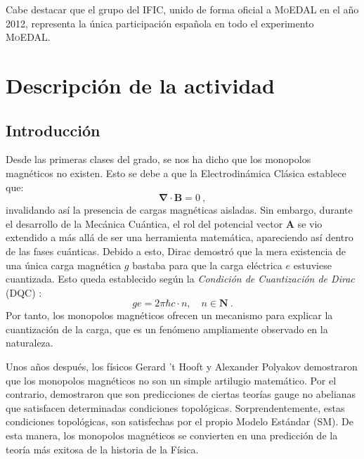 \documentclass[12pt, a4paper]{article}
\begin{document}
Cabe destacar que el grupo del IFIC, unido de forma oficial a \textsc{MoEDAL} en el año 2012, representa la única participación española en todo el experimento \textsc{MoEDAL}.
\section{Descripción de la actividad}
\subsection{Introducción}

Desde las primeras clases del grado, se nos ha dicho que los monopolos magnéticos no existen. Esto se debe a que la Electrodinámica Clásica establece que:
\begin{equation}
    \boldsymbol{\nabla}\cdot \boldsymbol{B}=0\ ,
\end{equation}
invalidando así la presencia de cargas magnéticas aisladas. Sin embargo, durante el desarrollo de la Mecánica Cuántica, el rol del potencial vector $\boldsymbol{A}$ se vio extendido a más allá de ser una herramienta matemática, apareciendo así dentro de las fases cuánticas. Debido a esto, Dirac demostró que la mera existencia de una única carga magnética $g$ bastaba para que la carga eléctrica $e$ estuviese cuantizada. Esto queda establecido según la \textit{Condición de Cuantización de Dirac} (DQC) \cite{Dirac1931}:
\begin{equation}
    ge=2\pi\hbar c\cdot n, \quad n\in \mathbf{N}\ .
\end{equation}
Por tanto, los monopolos magnéticos ofrecen un mecanismo para explicar la cuantización de la carga, que es un fenómeno ampliamente observado en la naturaleza.

Unos años después, los físicos Gerard 't Hooft y Alexander Polyakov \cite{Polyakov1974,tHooft1974} demostraron que los monopolos magnéticos no son un simple artilugio matemático. Por el contrario, demostraron que son predicciones de ciertas teorías gauge no abelianas que satisfacen determinadas condiciones topológicas. Sorprendentemente, estas condiciones topológicas, son satisfechas por el propio Modelo Estándar (SM). De esta manera, los monopolos magnéticos se convierten en una predicción de la teoría más exitosa de la historia de la Física.
\end{document}
